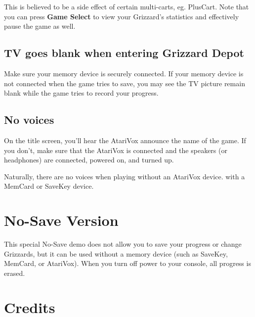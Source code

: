 \documentclass[10pt,twocolumn,openany,article]{memoir}
\begin{document}
This  is believed  to  be  a side  effect  of  certain multi-carts,  eg.
PlusCart.  Note that  you can  press \textbf{Game  Select} to  view your
Grizzard's statistics and effectively pause the game as well.

\fi

\ifdefined\NOSAVE\else\ifdefined\ATARIAGESAVE\else

\section{TV goes blank when entering Grizzard Depot}

Make  sure your  memory device  is  securely connected.  If your  memory
device is not connected when the game  tries to save, you may see the TV
picture remain blank while the game tries to record your progress.

\fi

\section{No voices}

On the title  screen, you'll hear the AtariVox announce  the name of the
game. If  you don't, make  sure that the  AtariVox is connected  and the
speakers (or headphones) are connected, powered on, and turned up.

Naturally,  there are  no  voices  when playing  \ifdefined\ATARIAGESAVE
without an AtariVox device. \else with a MemCard or SaveKey device. \fi

\fi

\ifdefined\NOSAVE

\columnbreak
\chapter{No-Save Version}

This special  No-Save demo does not  allow you to save  your progress or
change Grizzards,  but it can be  used without a memory  device (such as
SaveKey, MemCard, or AtariVox). When you turn off power to your console,
all progress is erased.

\fi

\fi %

\pagebreak
\chapter{Credits}
\end{document}
